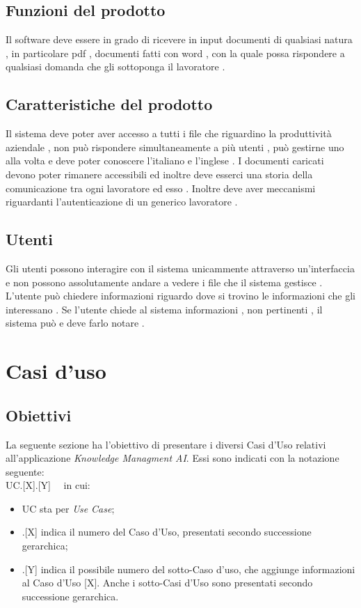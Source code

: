 \documentclass[10pt, a4paper]{article}
\begin{document}
\subsection{Funzioni del prodotto}
Il software deve essere in grado di ricevere in input documenti di qualsiasi natura , in particolare pdf , documenti fatti con word , con la quale possa rispondere a qualsiasi domanda che gli sottoponga il lavoratore . 
\subsection{Caratteristiche del prodotto}
Il sistema deve poter aver accesso a tutti i file che riguardino la produttività aziendale , non può rispondere simultaneamente a più utenti , può gestirne uno alla volta e deve poter conoscere l'italiano e l'inglese . I documenti caricati devono poter rimanere accessibili ed inoltre deve esserci una storia della comunicazione tra ogni lavoratore ed esso . Inoltre deve aver meccanismi riguardanti l'autenticazione di un generico lavoratore .
\subsection{Utenti}
Gli utenti possono interagire con il sistema unicammente attraverso un'interfaccia e non possono assolutamente andare a vedere i file che il sistema gestisce . L'utente può chiedere informazioni riguardo dove si trovino le informazioni che gli interessano . Se l'utente chiede al sistema informazioni , non pertinenti , il sistema può e deve farlo notare .

\newpage
\section{Casi d'uso}

\subsection{Obiettivi}
La seguente sezione ha l'obiettivo di presentare i diversi Casi d'Uso relativi all'applicazione \textit{Knowledge Managment AI}. Essi sono indicati con la notazione seguente: \\ UC.[X].[Y] \ \  in cui:
\begin{itemize}
\item UC sta per \textit{Use Case};
\item .[X] indica il numero del Caso d'Uso, presentati secondo successione gerarchica;
\item .[Y] indica il possibile numero del sotto-Caso d'uso, che aggiunge informazioni al Caso d'Uso [X]. Anche i sotto-Casi d'Uso sono presentati secondo successione gerarchica.
\end{itemize}
\end{document}
